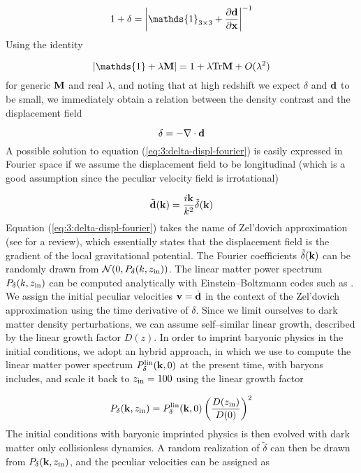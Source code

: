 \begin{equation}
\label{eq:3:delta-displ}
1+\delta = \left\vert\mathds{1}_{3\times 3}+\frac{\partial \bb{d}}{\partial \bb{x}}\right\vert^{-1}
\end{equation}
%
Using the identity

\begin{equation}
\label{eq:3:det-identity}
\vert\mathds{1}+\lambda\bb{M}\vert = 1 + \lambda\Tr\bb{M} + O(\lambda^2)
\end{equation}
%
for generic $\mathbf{M}$ and real $\lambda$, and noting that at high redshift we expect $\delta$ and $\mathbf{d}$ to be small, we immediately obtain a relation between the density contrast and the displacement field 

\begin{equation}
\label{eq:3:delta-displ-real}
\delta = -\nabla\cdot\mathbf{d}
\end{equation}
%
A possible solution to equation (\ref{eq:3:delta-displ-fourier}) is easily expressed in Fourier space if we assume the displacement field to be longitudinal (which is a good assumption since the peculiar velocity field is irrotational)

\begin{equation}
\label{eq:3:delta-displ-fourier}
\tilde{\mathbf{d}}(\mathbf{k}) = \frac{i\mathbf{k}}{k^2}\tilde{\delta}(\mathbf{k})
\end{equation}
%
Equation (\ref{eq:3:delta-displ-fourier}) takes the name of Zel'dovich approximation (see \citep{ZeldovichWhite} for a review), which essentially states that the displacement field is the gradient of the local gravitational potential. The Fourier coefficients $\tilde{\delta}(\mathbf{k})$ can be randomly drawn from $\mathcal{N}(0,P_\delta(k,z_{\rm in}))$. The linear matter power spectrum $P_\delta(k,z_{\rm in})$ can be computed analytically with Einstein--Boltzmann codes such as  \citep{CAMB}. We assign the initial peculiar velocities $\mathbf{v}=\dot{\mathbf{d}}$ in the context of the Zel'dovich approximation using the time derivative of $\delta$. Since we limit ourselves to dark matter density perturbations, we can assume self--similar linear growth, described by the linear growth factor $D(z)$. In order to imprint baryonic physics in the initial conditions, we adopt an hybrid approach, in which we use  to compute the linear matter power spectrum $P^{\rm lin}_\delta(\mathbf{k},0)$ at the present time, with baryons includes, and scale it back to $z_{\rm in}=100$ using the linear growth factor

\begin{equation}
\label{eq:3:hybrid-power}
P_\delta(\mathbf{k},z_{\rm in}) = P^{\rm lin}_\delta(\mathbf{k},0)\left(\frac{D(z_{\rm in})}{D(0)}\right)^2 
\end{equation}
%
The initial conditions with baryonic imprinted physics is then evolved with dark matter only collisionless dynamics. A random realization of $\tilde{\delta}$ can then be drawn from $P_\delta(\mathbf{k},z_{\rm in})$, and the peculiar velocities can be assigned as 

